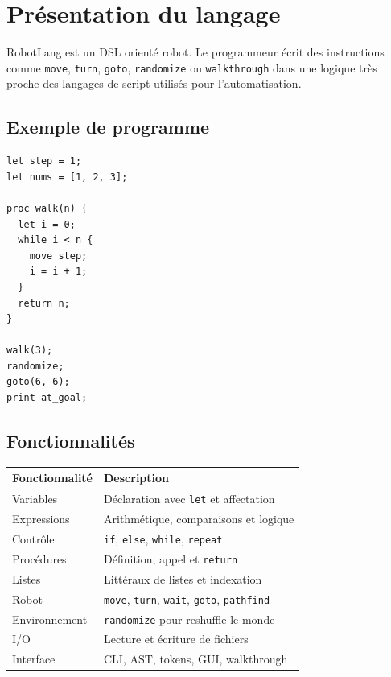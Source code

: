 \documentclass[12pt,a4paper]{article}
\begin{document}
\section{Présentation du langage}

RobotLang est un DSL orienté robot. Le programmeur écrit des instructions comme
\texttt{move}, \texttt{turn}, \texttt{goto}, \texttt{randomize} ou \texttt{walkthrough}
dans une logique très proche des langages de script utilisés pour l'automatisation.

\subsection{Exemple de programme}

\begin{lstlisting}[caption={Exemple de programme RobotLang}]
let step = 1;
let nums = [1, 2, 3];

proc walk(n) {
  let i = 0;
  while i < n {
    move step;
    i = i + 1;
  }
  return n;
}

walk(3);
randomize;
goto(6, 6);
print at_goal;
\end{lstlisting}

\subsection{Fonctionnalités}

\begin{longtable}{|p{4cm}|p{10cm}|}
\hline
\textbf{Fonctionnalité} & \textbf{Description} \\
\hline
Variables & Déclaration avec \texttt{let} et affectation \\
\hline
Expressions & Arithmétique, comparaisons et logique \\
\hline
Contrôle & \texttt{if}, \texttt{else}, \texttt{while}, \texttt{repeat} \\
\hline
Procédures & Définition, appel et \texttt{return} \\
\hline
Listes & Littéraux de listes et indexation \\
\hline
Robot & \texttt{move}, \texttt{turn}, \texttt{wait}, \texttt{goto}, \texttt{pathfind} \\
\hline
Environnement & \texttt{randomize} pour reshuffle le monde \\
\hline
I/O & Lecture et écriture de fichiers \\
\hline
Interface & CLI, AST, tokens, GUI, walkthrough \\
\hline
\end{longtable}
\end{document}
